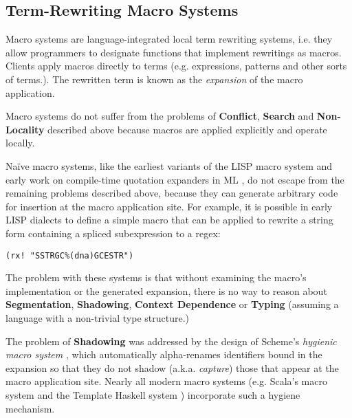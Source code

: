 {{\subsection{Term-Rewriting Macro Systems}\label{sec:macro-systems}
Macro systems are language-integrated local term rewriting systems, i.e. they allow programmers to designate functions that implement rewritings as macros. Clients apply macros directly to terms (e.g. expressions, patterns and other sorts of terms.). The rewritten term is known as the \emph{expansion} of the macro application.

Macro systems do not suffer from the problems of \textbf{Conflict}, \textbf{Search} and \textbf{Non-Locality} described above because macros are applied explicitly and operate locally.

Na\"ive macro systems, like the earliest variants of the LISP macro system \cite{Hart63a} and early work on compile-time quotation expanders in ML \cite{mauny1994complete}, do not escape from the remaining problems described above, because they can generate arbitrary code for insertion at the macro application site. For example, it is possible in early LISP dialects to define a simple macro  that can be applied to rewrite a string form containing a spliced subexpression to a regex:
\begin{lstlisting}[numbers=none]
(rx! "SSTRGC%(dna)GCESTR")
\end{lstlisting}
The problem with these systems is that without examining the macro's implementation or the generated expansion, there is no way to reason about \textbf{Segmentation}, \textbf{Shadowing}, \textbf{Context Dependence} or \textbf{Typing} (assuming a language with a non-trivial type structure.)

The problem of \textbf{Shadowing} was addressed by the design of Scheme's \emph{hygienic macro system} \cite{Kohlbecker86a,DBLP:conf/popl/Adams15}, which automatically alpha-renames identifiers bound in the expansion so that they do not shadow (a.k.a. \emph{capture}) those that appear at the macro application site. Nearly all modern macro systems (e.g. Scala's macro system \cite{ScalaMacros2013} and the Template Haskell system \cite{sheard2002template}) incorporate such a hygiene mechanism. %

}}
